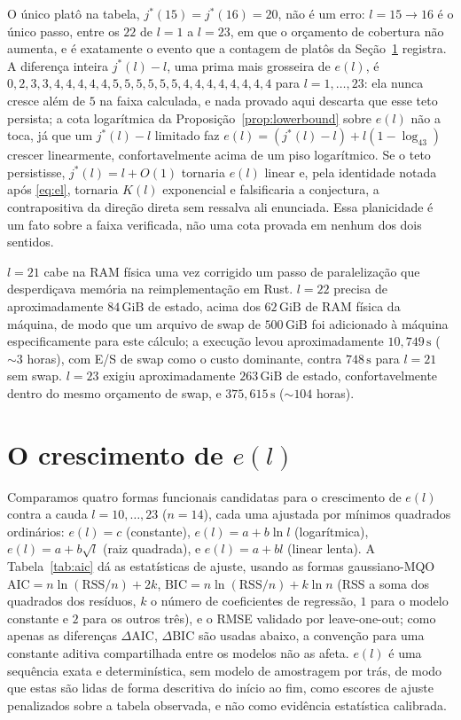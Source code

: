 \documentclass[11pt]{amsart}
\theoremstyle{plain}
\theoremstyle{definition}
\theoremstyle{remark}
\begin{document}
O único platô na tabela, $j^*(15)=j^*(16)=20$, não é um erro: $l=15\to16$ é o único passo, entre os
$22$ de $l=1$ a $l=23$, em que o orçamento de cobertura não aumenta, e é exatamente o evento que a
contagem de platôs da Seção~\ref{sec:growth} registra. A diferença inteira $j^*(l)-l$, uma prima
mais grosseira de $e(l)$, é $0,2,3,3,4,4,4,4,4,5,5,5,5,5,5,4,4,4,4,4,4,4,4$ para $l=1,\dots,23$:
ela nunca cresce além de $5$ na faixa calculada, e nada provado aqui descarta que esse teto
persista; a cota logarítmica da Proposição~\ref{prop:lowerbound} sobre $e(l)$ não a toca, já que um
$j^*(l)-l$ limitado faz $e(l)=(j^*(l)-l)+l(1-\log_43)$ crescer linearmente, confortavelmente acima
de um piso logarítmico. Se o teto persistisse, $j^*(l)=l+O(1)$ tornaria $e(l)$ linear e, pela
identidade notada após \eqref{eq:el}, tornaria $K(l)$ exponencial e falsificaria a conjectura, a
contrapositiva da direção direta sem ressalva ali enunciada. Essa planicidade é um fato sobre a
faixa verificada, não uma cota provada em nenhum dos dois sentidos.

$l=21$ cabe na RAM física uma vez corrigido um passo de paralelização que desperdiçava memória na
reimplementação em Rust. $l=22$ precisa de aproximadamente $84\,\mathrm{GiB}$ de estado, acima dos
$62\,\mathrm{GiB}$ de RAM física da máquina, de modo que um arquivo de swap de $500\,\mathrm{GiB}$
foi adicionado à máquina especificamente para este cálculo; a execução levou aproximadamente
$10{,}749\,\mathrm{s}$ ($\sim\!3$ horas), com E/S de swap como o custo dominante, contra
$748\,\mathrm{s}$ para $l=21$ sem swap. $l=23$ exigiu aproximadamente $263\,\mathrm{GiB}$ de estado,
confortavelmente dentro do mesmo orçamento de swap, e $375{,}615\,\mathrm{s}$ ($\sim\!104$ horas).

\section{O crescimento de $e(l)$}
\label{sec:growth}

Comparamos quatro formas funcionais candidatas para o crescimento de $e(l)$ contra a cauda
$l=10,\dots,23$ ($n=14$), cada uma ajustada por mínimos quadrados ordinários: $e(l)=c$ (constante),
$e(l)=a+b\ln l$ (logarítmica), $e(l)=a+b\sqrt l$ (raiz quadrada), e $e(l)=a+bl$ (linear lenta). A
Tabela~\ref{tab:aic} dá as estatísticas de ajuste, usando as formas gaussiano-MQO
$\mathrm{AIC}=n\ln(\mathrm{RSS}/n)+2k$, $\mathrm{BIC}=n\ln(\mathrm{RSS}/n)+k\ln n$ (RSS a soma dos
quadrados dos resíduos, $k$ o número de coeficientes de regressão, $1$ para o modelo constante e
$2$ para os outros três), e o RMSE validado por leave-one-out; como apenas as diferenças
$\Delta\mathrm{AIC}$, $\Delta\mathrm{BIC}$ são usadas abaixo, a convenção para uma constante
aditiva compartilhada entre os modelos não as afeta. $e(l)$ é uma sequência exata e determinística,
sem modelo de amostragem por trás, de modo que estas são lidas de forma descritiva do início ao
fim, como escores de ajuste penalizados sobre a tabela observada, e não como evidência estatística
calibrada.
\end{document}
